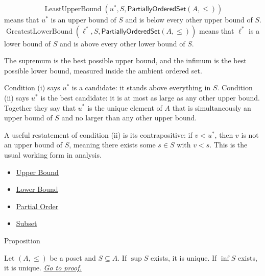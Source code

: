\begin{remark*}
\[
  \operatorname{LeastUpperBound}(u^*,S,\mathsf{PartiallyOrderedSet}(A,\leq))
\]
means that $u^*$ is an upper bound of $S$ and is below every other upper bound
of $S$. $\operatorname{GreatestLowerBound}(\ell^*,S,\mathsf{PartiallyOrderedSet}(A,\leq))$
means that $\ell^*$ is a lower bound of $S$ and is above every other lower
bound of $S$.
\end{remark*}

\begin{remark*}[Interpretation]
The supremum is the best possible upper bound, and the infimum is the best
possible lower bound, measured inside the ambient ordered set.
\end{remark*}

\begin{remark*}[Exposition]
Condition (i) says $u^*$ is a candidate: it stands above everything in $S$.
Condition (ii) says $u^*$ is the best candidate: it is at most as large as any
other upper bound. Together they say that $u^*$ is the unique element of $A$
that is simultaneously an upper bound of $S$ and no larger than any other upper
bound.

A useful restatement of condition (ii) is its contrapositive: if $v < u^*$,
then $v$ is not an upper bound of $S$, meaning there exists some $s \in S$ with
$v < s$. This is the usual working form in analysis.
\end{remark*}

\begin{dependencies}
\begin{itemize}
  \item \hyperref[def:upper-bound]{Upper Bound}
  \item \hyperref[def:lower-bound]{Lower Bound}
  \item \hyperref[def:partial-order]{Partial Order}
  \item \hyperref[def:subset]{Subset}
\end{itemize}
\end{dependencies}


\begin{propositionbox}{Proposition}
\begin{proposition}
\label{prop:sup-unique}
Let $(A, \leq)$ be a poset and $S \subseteq A$.  If $\sup S$ exists, it is
unique.  If $\inf S$ exists, it is unique.
\hyperref[prf:sup-unique]{\textit{Go to proof.}}
\end{proposition}
\end{propositionbox}

